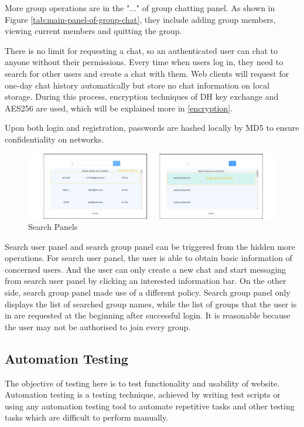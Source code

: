 More group operations are in the "..." of group chatting panel. As shown in Figure \ref{tab:main-panel-of-group-chat}, they include adding group members, viewing current members and quitting the group.

There is no limit for requesting a chat, so an authenticated user can chat to anyone without their permissions. Every time when users log in, they need to search for other users and create a chat with them. Web clients will request for one-day chat history automatically but store no chat information on local storage. During this process, encryption techniques of DH key exchange and AES256 are used, which will be explained more in \ref{encryption}.

Upon both login and registration, passwords are hashed locally by MD5 to ensure confidentiality on networks.

\begin{figure}[H]
 \centering
  \includegraphics[width=1\textwidth]{images/search.png}
  \caption{Search Panels}
\end{figure}

Search user panel and search group panel can be triggered from the hidden more operations. For search user panel, the user is able to obtain basic information of concerned users. And the user can only create a new chat and start messaging from search user panel by clicking an interested information bar. On the other side, search group panel made use of a different policy. Search group panel only displays the list of searched group names, while the list of groups that the user is in are requested at the beginning after successful login. It is reasonable because the user may not be authorised to join every group. 

\subsection{Automation Testing}

The objective of testing here is to test functionality and usability of website. Automation testing is a testing technique, achieved by writing test scripts or using any automation testing tool to automate repetitive tasks and other testing tasks which are difficult to perform manually\cite{automation-testing}.

